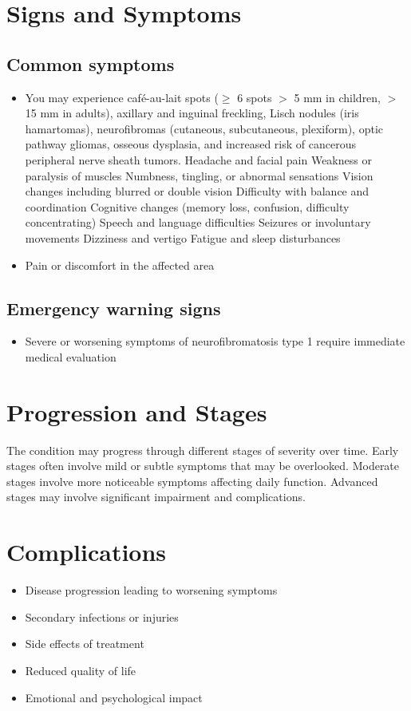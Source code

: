 \section{Signs and Symptoms}
\subsection{Common symptoms}
\begin{itemize}[noitemsep]
  \item You may experience caf\'{e}-au-lait spots ($\ge$ 6 spots $>$ 5 mm in children, $>$ 15 mm in adults), axillary and inguinal freckling, Lisch nodules (iris hamartomas), neurofibromas (cutaneous, subcutaneous, plexiform), optic pathway gliomas, osseous dysplasia, and increased risk of cancerous peripheral nerve sheath tumors. Headache and facial pain Weakness or paralysis of muscles Numbness, tingling, or abnormal sensations Vision changes including blurred or double vision Difficulty with balance and coordination Cognitive changes (memory loss, confusion, difficulty concentrating) Speech and language difficulties Seizures or involuntary movements Dizziness and vertigo Fatigue and sleep disturbances
  \item Pain or discomfort in the affected area
  \end{itemize}
\subsection{Emergency warning signs}
\begin{itemize}[noitemsep]
  \item Severe or worsening symptoms of neurofibromatosis type 1 require immediate medical evaluation
\end{itemize}
\section{Progression and Stages}
The condition may progress through different stages of severity over time. Early stages often involve mild or subtle symptoms that may be overlooked. Moderate stages involve more noticeable symptoms affecting daily function. Advanced stages may involve significant impairment and complications.
\section{Complications}
\begin{itemize}[noitemsep]
  \item Disease progression leading to worsening symptoms
  \item Secondary infections or injuries
  \item Side effects of treatment
  \item Reduced quality of life
  \item Emotional and psychological impact
\end{itemize}
